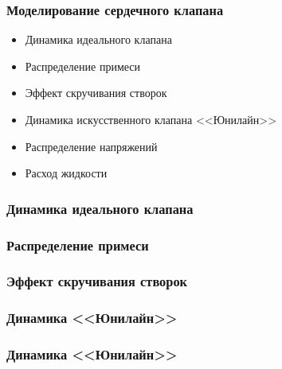 \documentclass[14pt]{beamer}
\begin{document}
\begin{frame}
\frametitle{Моделирование сердечного клапана}
    \begin{itemize}
        \item[\MVRightarrow] Динамика идеального клапана
        \item[\MVRightarrow] Распределение примеси
        \item[\MVRightarrow] Эффект скручивания створок
        \item[\MVRightarrow] Динамика искусственного клапана <<Юнилайн>>
        \item[\MVRightarrow] Распределение напряжений
        \item[\MVRightarrow] Расход жидкости
    \end{itemize}
\end{frame}


\begin{frame}
\frametitle{Динамика идеального клапана}
\end{frame}

\begin{frame}
\frametitle{Распределение примеси}
\end{frame}

\begin{frame}
\frametitle{Эффект скручивания створок}
\end{frame}

\begin{frame}
\frametitle{Динамика <<Юнилайн>>}
\end{frame}

\begin{frame}
\frametitle{Динамика <<Юнилайн>>}
\end{frame}
\end{document}
